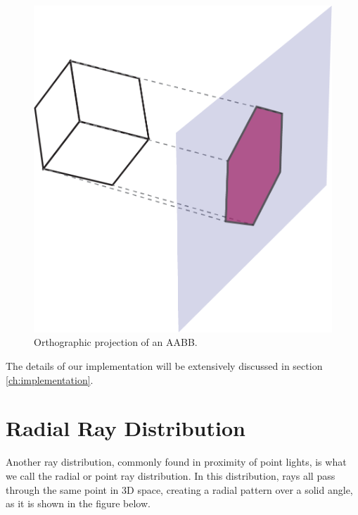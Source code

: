 \documentclass{PoliMi_MasterThesis}
\begin{document}
\begin{figure}[H]
    \centering
    \includegraphics[width=\textwidth*\real{0.45}]{Images/ortho_projection.png}
    \caption{Orthographic projection of an AABB.}
    \label{fig:aabb_ortho_projection}
\end{figure}

The details of our implementation will be extensively discussed in section \ref{ch:implementation}.

\section{Radial Ray Distribution} \label{sec:point_ray_distribution}
Another ray distribution, commonly found in proximity of point lights, is what we call the radial or point ray distribution. In this distribution, rays all pass through the same point in 3D space, creating a radial pattern over a solid angle, as it is shown in the figure below.
\end{document}
